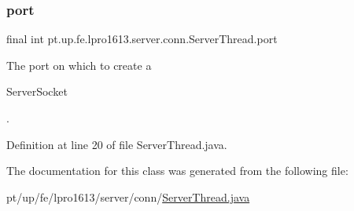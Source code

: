 \subsubsection{\texorpdfstring{port}{port}}
{\footnotesize\ttfamily final int pt.\+up.\+fe.\+lpro1613.\+server.\+conn.\+Server\+Thread.\+port}

The port on which to create a
\begin{DoxyCode}
ServerSocket 
\end{DoxyCode}
 . 

Definition at line 20 of file Server\+Thread.\+java.



The documentation for this class was generated from the following file\+:\begin{DoxyCompactItemize}
\item 
pt/up/fe/lpro1613/server/conn/\hyperlink{_server_thread_8java}{Server\+Thread.\+java}\end{DoxyCompactItemize}
